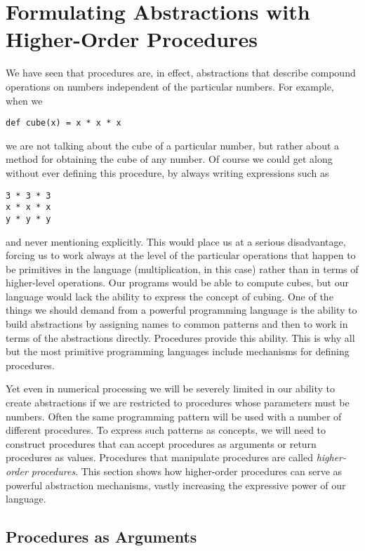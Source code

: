 \section{Formulating Abstractions with Higher-Order Procedures}

We have seen that procedures are, in effect, abstractions that describe compound operations on numbers independent of the particular numbers. For example, when we

\begin{lstlisting}[style=slate]
def cube(x) = x * x * x
\end{lstlisting}

we are not talking about the cube of a particular number, but rather about a method for obtaining the cube of any number. Of course we could get along without ever defining this procedure, by always writing expressions such as

\begin{lstlisting}[style=slate]
3 * 3 * 3
x * x * x
y * y * y
\end{lstlisting}

and never mentioning  explicitly. This would place us at a serious disadvantage, forcing us to work always at the level of the particular operations that happen to be primitives in the language (multiplication, in this case) rather than in terms of higher-level operations. Our programs would be able to compute cubes, but our language would lack the ability to express the concept of cubing. One of the things we should demand from a powerful programming language is the ability to build abstractions by assigning names to common patterns and then to work in terms of the abstractions directly. Procedures provide this ability. This is why all but the most primitive programming languages include mechanisms for defining procedures.

Yet even in numerical processing we will be severely limited in our ability to create abstractions if we are restricted to procedures whose parameters must be numbers. Often the same programming pattern will be used with a number of different procedures. To express such patterns as concepts, we will need to construct procedures that can accept procedures as arguments or return procedures as values. Procedures that manipulate procedures are called \emph{higher-order procedures}. This section shows how higher-order procedures can serve as powerful abstraction mechanisms, vastly increasing the expressive power of our language.

\subsection{Procedures as Arguments}

